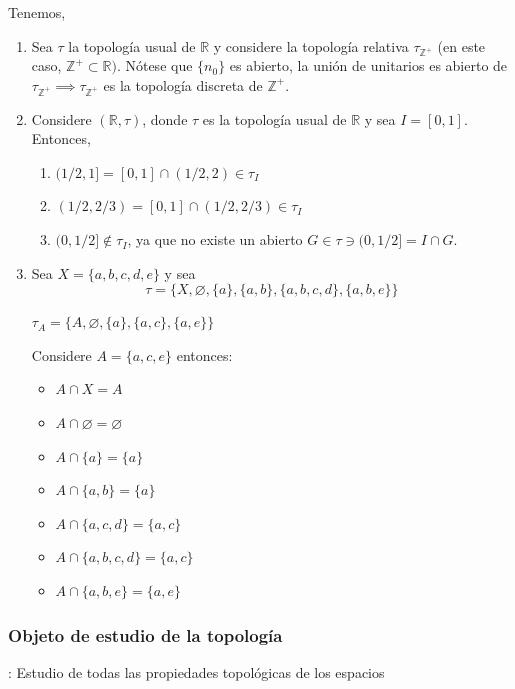 \begin{ejemplo}
    Tenemos, 
    \begin{enumerate}
        \item Sea $\tau$ la topología usual de $\mathbb{R}$ y considere la topología relativa $\tau_{\mathbb{Z}^+}$ (en este caso, $\mathbb{Z}^+\subset \mathbb{R})$. Nótese que $\{n
        _0\}$ es abierto, la unión de unitarios es abierto de $\tau_{\mathbb{Z}^+}\implies \tau_{\mathbb{Z}^+}$ es la topología discreta de $\mathbb{Z}^+$.
        \item Considere $(\mathbb{R},\tau)$, donde $\tau$ es la topología usual de $\mathbb{R}$ y  sea $I=[0,1]$. Entonces, 
        \begin{enumerate}
            \item $(1/2,1]=[0,1]\cap (1/2,2)\in \tau_I$
            \item $(1/2,2/3)=[0,1]\cap (1/2,2/3)\in \tau_I$
            \item $(0,1/2]\not\in \tau_I$, ya que no existe un abierto $G\in \tau\ni (0,1/2]=I\cap G$.
        \end{enumerate}
        \item Sea $X=\{a,b,c,d,e\}$ y sea 
        $$\tau=\{X,\varnothing,\{a\},\{a,b\},\{a,b,c,d\},\{a,b,e\}\}$$
        \begin{cajita}
            $\tau_A=\{A,\varnothing,\{a\},\{a,c\},\{a,e\}\}$
        \end{cajita}
        Considere $A=\{a,c,e\}$ entonces: \begin{itemize}
            \item $A\cap X=A$
            \item $A\cap\varnothing=\varnothing$
            \item $A\cap\{a\}=\{a\}$
            \item $A\cap\{a,b\}=\{a\}$
            \item $A\cap\{a,c,d\}=\{a,c\}$
            \item $A\cap \{a,b,c,d\}=\{a,c\}$
            \item $A\cap\{a,b,e\}=\{a,e\}$
        \end{itemize}
    \end{enumerate}
\end{ejemplo}

\subsubsection{Objeto de estudio de la topología}: Estudio de todas las propiedades topológicas de los espacios

